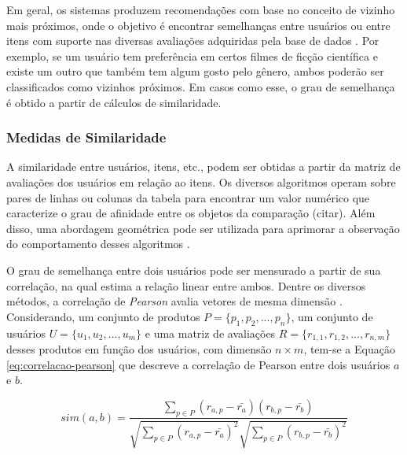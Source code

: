         Em geral, os sistemas produzem recomendações com base no conceito de vizinho mais próximos, onde o objetivo é encontrar semelhanças entre usuários ou entre itens com suporte nas diversas avaliações adquiridas pela base de dados \cite{Mustafa2017}. Por exemplo, se um usuário tem preferência em certos filmes de ficção científica e existe um outro que também tem algum gosto pelo gênero, ambos poderão ser classificados como vizinhos próximos. Em casos como esse, o grau de semelhança é obtido a partir de cálculos de similaridade.
        
        \subsubsection{Medidas de Similaridade} \label{sssec:similaridade}
        
        A similaridade entre usuários, itens, etc., podem ser obtidas a partir da matriz de avaliações dos usuários em relação ao itens. Os diversos algoritmos operam sobre pares de linhas ou colunas da tabela para encontrar um valor numérico que caracterize o grau de afinidade entre os objetos da comparação (citar). Além disso, uma abordagem geométrica pode ser utilizada para aprimorar a observação do comportamento desses algoritmos \cite{Jones1987}.
        
        O grau de semelhança entre dois usuários pode ser mensurado a partir de sua correlação, na qual estima a relação linear entre ambos. Dentre os diversos métodos, a correlação de \textit{Pearson} avalia vetores de mesma dimensão \cite{Ricci2010}. Considerando, um conjunto de produtos $P=\{p_1, p_2, ..., p_n\}$, um conjunto de usuários $U = \{u_1, u_2, ..., u_m\}$ e uma matriz de avaliações $R=\{r_{1,1}, r_{1,2}, ..., r_{n, m}\}$ desses produtos em função dos usuários, com dimensão  $n\times m$, tem-se a Equação \ref{eq:correlacao-pearson} que descreve a correlação de Pearson entre dois usuários $a$ e $b$.
             
        \begin{equation}
             sim(a, b) = \frac{\sum_{p\in P}(r_{a, p}-\bar{r_a})(r_{b, p}-\bar{r_b})}{\sqrt{\sum_{p\in P}(r_{a, p}-\bar{r_a})^2}\sqrt{\sum_{p\in P}(r_{b, p}-\bar{r_b})^2}}\label{eq:correlacao-pearson}
        \end{equation}
        
